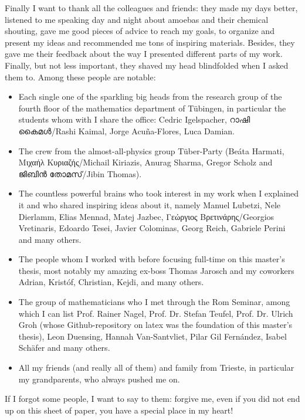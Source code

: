 Finally I want to thank all the colleagues and friends: they made my days better, listened to me speaking day and night about amoebas and their chemical shouting, gave me good pieces of advice to reach my goals, to organize and present my ideas and recommended me tons of inspiring materials.
Besides, they gave me their feedback about the way I presented different parts of my work.
Finally, but not less important, they shaved my head blindfolded when I asked them to.
Among these people are notable: 
\begin{itemize}
	\item Each single one of the sparkling big heads from the research group of the fourth floor of the mathematics department of Tübingen, in particular the students whom with I share the office: Cedric Igelspacher, {\malayalamfont റാഷി കൈമൾ}/Rashi Kaimal, Jorge Acuña-Flores, Luca Damian.
	\item The crew from the almost-all-physics group Tüber-Party (Beáta Harmati, Μιχαήλ Κυριαζής/Michail Kiriazis, Anurag Sharma, Gregor Scholz and {\malayalamfont ജിബിൻ തോമസ്}/Jibin Thomas).
	\item The countless powerful brains who took interest in my work when I explained it and who shared inspiring ideas about it, namely Manuel Lubetzi, Nele Dierlamm, Elias Mennad, Matej Jazbec, Γεώργιος Βρετινάρης/Georgios Vretinaris, Edoardo Tesei, Javier Colominas, Georg Reich, Gabriele Perini and many others.
	\item The people whom I worked with before focusing full-time on this master's thesis, most notably my amazing ex-boss Thomas Jarosch and my coworkers Adrian, Kristóf, Christian, Kejdi, and many others.
	\item The group of mathematicians who I met through the Rom Seminar, among which I can list Prof. Rainer Nagel, Prof. Dr. Stefan Teufel, Prof. Dr. Ulrich Groh (whose Github-repository on latex was the foundation of this master's thesis), Leon Duensing, Hannah Van-Santvliet, Pilar Gil Fernández, Isabel Schäfer and many others.	
	\item All my friends (and really all of them) and family from Trieste, in particular my grandparents, who always pushed me on.
\end{itemize}
If I forgot some people, I want to say to them: forgive me, even if you did not end up on this sheet of paper, you have a special place in my heart! 